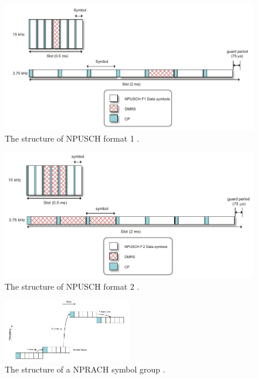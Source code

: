 \begin{minipage}{0.48\textwidth}
\begin{figure}[H]
\centering
\includegraphics[width=\textwidth]{figures/NPUSCH1_structure.pdf}
\caption{The structure of NPUSCH format 1 \citep{NB-IoT_Book}.}
\label{fig:NPUSCH1_structure}
\end{figure}
\end{minipage}%
\hfill
\begin{minipage}{0.48\textwidth}
\begin{figure}[H]
\centering
\includegraphics[width=\textwidth]{figures/NPUSCH2_structure.pdf}
\caption{The structure of NPUSCH format 2 \citep{NB-IoT_Book}.}
\label{fig:NPUSCH2_structure}
\end{figure}
\end{minipage}


\begin{figure}[H]
\centering
\includegraphics[width=0.5\textwidth]{figures/NPRACH_frequency_hopping.pdf}
\caption{The structure of a NPRACH symbol group \citep{NB-IoT_Book}.}
\label{fig:NPRACH_structure}
\end{figure}

